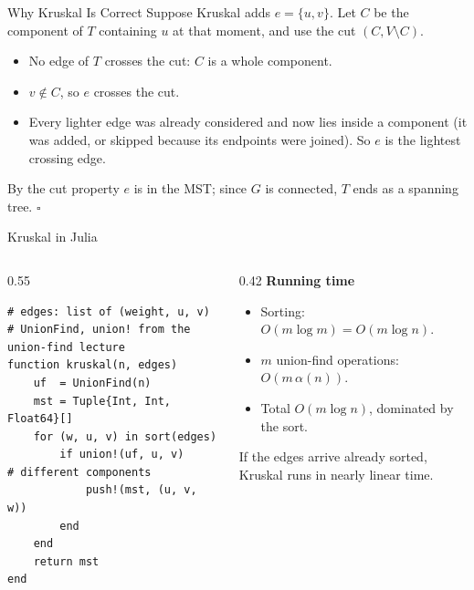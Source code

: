 \documentclass[10pt,aspectratio=169]{beamer}
\begin{document}
\begin{frame}{Why Kruskal Is Correct}
  Suppose Kruskal adds $e = \{u, v\}$. Let $C$ be the component of $T$
  containing $u$ at that moment, and use the cut $(C, V \setminus C)$.

  \begin{center}
  \end{center}

  \begin{itemize}
    \item No edge of $T$ crosses the cut: $C$ is a whole component.
    \item $v \notin C$, so $e$ crosses the cut.
    \item Every lighter edge was already considered and now lies inside a
          component (it was added, or skipped because its endpoints were
          joined). So $e$ is the \alert{lightest} crossing edge.
  \end{itemize}
  By the cut property $e$ is in the MST; since $G$ is connected, $T$ ends as a
  spanning tree. \hfill $\square$
\end{frame}

\begin{frame}[fragile]{Kruskal in Julia}
  \begin{columns}[c]
    \begin{column}{0.55\textwidth}
\begin{lstlisting}
# edges: list of (weight, u, v)
# UnionFind, union! from the union-find lecture
function kruskal(n, edges)
    uf  = UnionFind(n)
    mst = Tuple{Int, Int, Float64}[]
    for (w, u, v) in sort(edges)
        if union!(uf, u, v)      # different components
            push!(mst, (u, v, w))
        end
    end
    return mst
end
\end{lstlisting}
    \end{column}
    \begin{column}{0.42\textwidth}
      \textbf{Running time}
      \begin{itemize}
        \item Sorting: $O(m \log m) = O(m \log n)$.
        \item $m$ union-find operations: $O(m \, \alpha(n))$.
        \item Total $O(m \log n)$, dominated by the sort.
      \end{itemize}

      \medskip
      If the edges arrive already sorted, Kruskal runs in nearly linear time.
    \end{column}
  \end{columns}
\end{frame}
\end{document}
